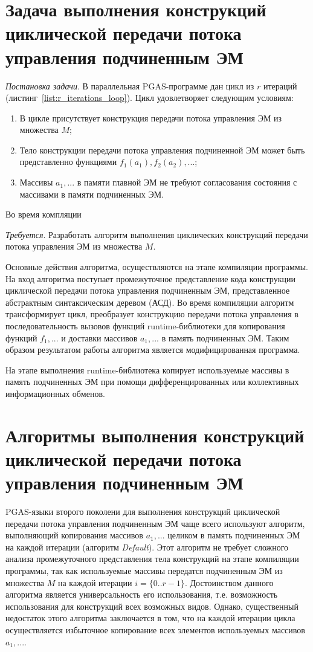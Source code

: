 \section{Задача выполнения конструкций циклической передачи потока управления
  подчиненным ЭМ}

\textit{Постановка задачи}. В параллельная PGAS-программе дан цикл из $r$
итераций (листинг~\ref{list:r_iterations_loop}). Цикл удовлетворяет следующим
условиям:
\begin{enumerate}
\item В цикле присутствует конструкция передачи потока управления ЭМ из
  множества $M$;
\item Тело конструкции передачи потока управления подчиненной ЭМ может быть
  представленно функциями $f_{1}(a_{1}), f_{2}(a_{2}),...$;
\item Массивы $a_{1},...$ в памяти главной ЭМ не требуют согласования состояния
  с массивами в памяти подчиненных ЭМ.
\end{enumerate}

Во время компляции

\textit{Требуется}. Разработать алгоритм выполнения циклических конструкций
передачи потока управления ЭМ из множества $M$.

Основные действия алгоритма, осуществляются на этапе компиляции программы.
На вход алгоритма поступает промежуточное представление кода конструкции
циклической передачи потока управления подчиненным ЭМ, представленное
абстрактным синтаксическим деревом (АСД). Во время компиляции алгоритм
трансформирует цикл, преобразует конструкцию передачи потока управления в
последовательность вызовов функций runtime-библиотеки для копирования функций
$f_{1},...$ и доставки массивов $a_{1},...$ в память подчиненных ЭМ. Таким
образом результатом работы алгоритма является модифицированная программа.

На этапе выполнения runtime-библиотека копирует используемые массивы в память
подчиненных ЭМ при помощи дифференцированных или коллективных информационных
обменов.

\section{Алгоритмы выполнения конструкций циклической передачи потока управления
  подчиненным ЭМ}

PGAS-языки второго поколени для выполнения конструкций циклической
передачи потока управления подчиненным ЭМ чаще всего используют алгоритм,
выполняющий копирования массивов $a_{1},...$ целиком в память подчиненных ЭМ
на каждой итерации (алгоритм \textit{Default}). Этот алгоритм не требует
сложного анализа промежуточного представления тела конструкций на этапе
компиляции программы, так как используемые массивы передатся подчиненным ЭМ из
множества $M$ на каждой итерации $i=\{0..r-1\}$. Достоинством данного алгоритма
является универсальность его использования, т.е. возможность использования
для конструкций всех возможных видов. Однако, существенный недостаток этого
алгоритма заключается в том, что на каждой итерации цикла осуществляется
избыточное копирование всех элементов используемых массивов $a_{1},...$.

